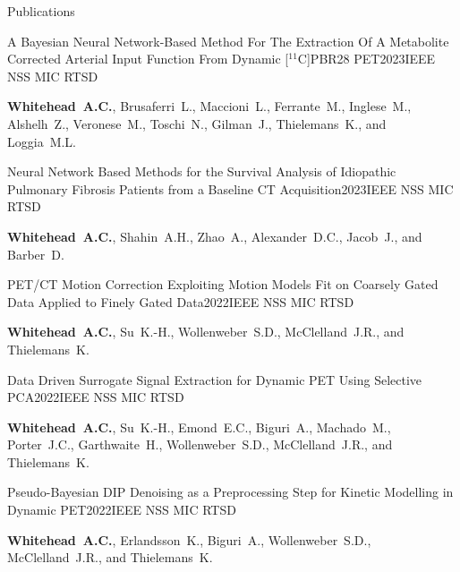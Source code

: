 \documentclass{cv}
\begin{document}
\begin{rSection}{Publications}
        \item \begin{rSubsection}{A Bayesian Neural Network-Based Method For The Extraction Of A Metabolite Corrected Arterial Input Function From Dynamic [$^{11}$C]PBR28 PET}{2023}{IEEE NSS MIC RTSD}{}
            \item \textbf{Whitehead~A.C.}, Brusaferri~L., Maccioni~L., Ferrante~M., Inglese~M., Alshelh~Z., Veronese~M., Toschi~N., Gilman~J., Thielemans~K., and Loggia~M.L.
        \end{rSubsection}

        \item \begin{rSubsection}{Neural Network Based Methods for the Survival Analysis of Idiopathic Pulmonary Fibrosis Patients from a Baseline CT Acquisition}{2023}{IEEE NSS MIC RTSD}{}
            \item \textbf{Whitehead~A.C.}, Shahin~A.H., Zhao~A., Alexander~D.C., Jacob~J., and Barber~D.
        \end{rSubsection}
        
        \item \begin{rSubsection}{PET/CT Motion Correction Exploiting Motion Models Fit on Coarsely Gated Data Applied to Finely Gated Data}{2022}{IEEE NSS MIC RTSD}{}
            \item \textbf{Whitehead~A.C.}, Su~K.-H., Wollenweber~S.D., McClelland~J.R., and Thielemans~K.
        \end{rSubsection}
        
        \item \begin{rSubsection}{Data Driven Surrogate Signal Extraction for Dynamic PET Using Selective PCA}{2022}{IEEE NSS MIC RTSD}{}
            \item \textbf{Whitehead~A.C.}, Su~K.-H., Emond~E.C., Biguri~A., Machado~M., Porter~J.C., Garthwaite~H., Wollenweber~S.D., McClelland~J.R., and Thielemans~K.
        \end{rSubsection}
        
        \item \begin{rSubsection}{Pseudo-Bayesian DIP Denoising as a Preprocessing Step for Kinetic Modelling in Dynamic \newline PET}{2022}{IEEE NSS MIC RTSD}{}
            \item \textbf{Whitehead~A.C.}, Erlandsson~K., Biguri~A., Wollenweber~S.D., McClelland~J.R., and Thielemans~K.
        \end{rSubsection}
        

\end{rSection}
\end{document}
